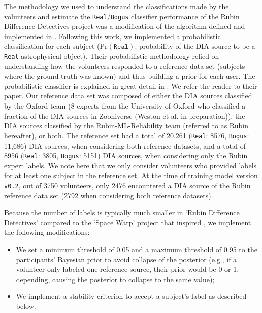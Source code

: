 \documentclass[DM,authoryear,toc]{lsstdoc}
\newcommand{\V}[1]{{\texttt{v0.#1}}}
\begin{document}
The methodology we used to understand the classifications made by the volunteers and estimate the \texttt{Real}/\texttt{Bogus} classifier performance of the Rubin Difference Detectives project was a modification of the algorithm defined and implemented in \cite{marshall2016space}. %
Following this work, we implemented a probabilistic classification for each subject ($\text{Pr}(\texttt{Real})$: probability of the DIA source to be a \texttt{Real} astrophysical object). %
Their probabilistic methodology relied on understanding how the volunteers responded to a reference data set (subjects where the ground truth was known) and thus building a prior for each user. The probabilistic classifier is explained in great detail in \cite{marshall2016space}. We refer the reader to their paper. 
Our reference data set was composed of either the DIA sources classified by the Oxford team (8 experts from the University of Oxford who classified a fraction of the DIA sources in Zooniverse (Weston et al. in preparation)), the DIA sources classified by the Rubin-ML-Reliability team (referred to as Rubin hereafter), or both. The reference set had a total of 20,261 (\texttt{Real}: 8576, \texttt{Bogus}: 11,686) DIA sources, when considering both reference datasets, and a total of 8956 (\texttt{Real}: 3805, \texttt{Bogus}: 5151)  DIA sources, when considering only the Rubin expert labels.  We note here that we only consider volunteers who provided labels for at least one subject in the reference set. At the time of training model version \V2, out of 3750 volunteers, only 2476 encountered a DIA source of the Rubin reference data set (2792 when considering both reference datasets). 

Because the number of labels is typically much smaller in `Rubin Difference Detectives' compared to the `Space Warp' project that inspired \cite{marshall2016space}, we implement the following modifications: 
\begin{itemize}
\item{We set a minimum threshold of 0.05 and a maximum threshold of 0.95 to the participants' Bayesian prior to avoid collapse of the posterior (e.g., if a volunteer only labeled one reference source, their prior would be 0 or 1, depending, causing the posterior to collapse to the same value);}
\item{We implement a stability criterion to accept a subject's label as described below.}
\end{itemize}
\end{document}
